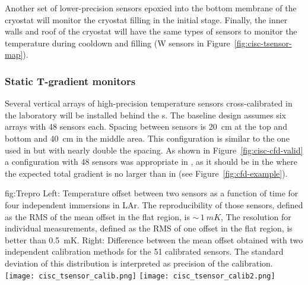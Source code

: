 
Another set of lower-precision sensors epoxied into the bottom membrane of the cryostat will monitor  the cryostat filling in the initial stage.   
Finally, the inner walls and roof of the cryostat will have the same types of sensors to monitor the temperature during cooldown and filling (W sensors in Figure~\ref{fig:cisc-tsensor-map}).
 
 

\subsubsection{Static T-gradient monitors}
\label{sec:fdgen-slow-cryo-static-therm}

Several vertical arrays of high-precision temperature sensors cross-calibrated in the laboratory will be installed behind the s.  
The baseline design assumes six arrays with \num{48} sensors each. Spacing between sensors
is \SI{20}{cm} at the top and bottom and \SI{40}{cm} in the middle area. This configuration is similar to the one used in  but with nearly double the spacing. 
As shown in Figure~\ref{fig:cisc-cfd-valid} a configuration with \num{48} sensors was appropriate in , as it should be in the  where the expected total gradient is no larger than in  (see Figure~\ref{fig:cfd-example}). 

\begin{dunefigure}{fig:Trepro}{
 Left:   Temperature offset between two sensors as a function of time for four independent immersions in LAr. The reproducibility of those sensors, defined as the RMS of the mean offset in the flat region, is $\sim\,\SI{1}{mK}$,
    The resolution for individual measurements, defined as the RMS of one offset in the flat region, is better than \SI{0.5}{mK}. Right: Difference between the mean offset obtained with two independent calibration methods for the 51 calibrated sensors. The standard deviation of this distribution is interpreted as precision of the calibration.}
  \texttt{[image: cisc\_tsensor\_calib.png]}%
  \texttt{[image: cisc\_tsensor\_calib2.png]}%
\end{dunefigure}

